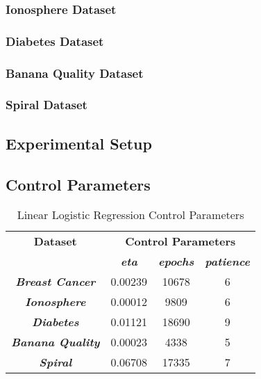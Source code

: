 \documentclass[10pt, conference]{IEEEtran}
\begin{document}
\subsubsection{Ionosphere Dataset}

\subsubsection{Diabetes Dataset}

\subsubsection{Banana Quality Dataset}

\subsubsection{Spiral Dataset}

\subsection{Experimental Setup} \label{section: experimental_setup_emp}

\subsection{Control Parameters} \label{section: control_parameters}

\begin{table}[h!]
    \caption{Linear Logistic Regression Control Parameters}
    \begin{center}
        \begin{tabular}{|c||c|c|c|}
            \hline
            \textbf{Dataset}&\multicolumn{3}{|c|}{\textbf{Control Parameters}} \\
            \cline{2-4}
                        & \textbf{\textit{eta}} & \textbf{\textit{epochs}} & \textbf{\textit{patience}}\\
            \hline
            \textbf{\textit{Breast Cancer}} & 0.00239 & 10678 & 6 \\
            \textbf{\textit{Ionosphere}} & 0.00012 & 9809 & 6\\
            \textbf{\textit{Diabetes}} & 0.01121 & 18690 & 9\\
            \textbf{\textit{Banana Quality}}  & 0.00023 & 4338 & 5 \\
            \textbf{\textit{Spiral}} & 0.06708 & 17335 & 7\\
            \hline
        \end{tabular}
    \end{center}
    \label{table: LR_control_parameters}
\end{table}
\end{document}
